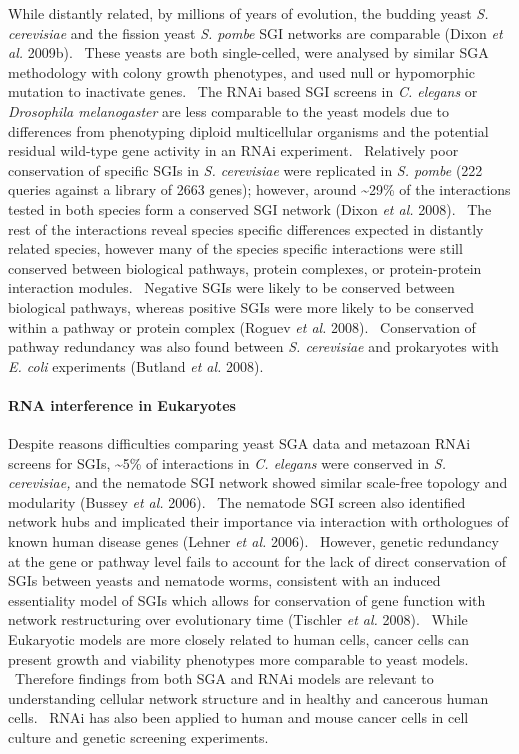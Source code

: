 While distantly related, by millions of years of evolution, the budding yeast \textit{S. cerevisiae} and the fission yeast \textit{S. pombe} SGI networks are comparable (Dixon\textit{ et al.} 2009b). \ These yeasts are both single-celled, were analysed by similar SGA methodology with colony growth phenotypes, and used null or hypomorphic mutation to inactivate genes. \ The RNAi based SGI screens in \textit{C. elegans }or \textit{Drosophila melanogaster} are less comparable to the yeast models due to differences from phenotyping diploid multicellular organisms and the potential residual wild-type gene activity in an RNAi experiment. \ Relatively poor conservation of specific SGIs in \textit{S. cerevisiae} were replicated in \textit{S. pombe} (222 queries against a library of 2663 genes); however, around \~{}29\% of the interactions tested in both species form a conserved SGI network (Dixon\textit{ et al.} 2008). \ The rest of the interactions reveal species specific differences expected in distantly related species, however many of the species specific interactions were still conserved between biological pathways, protein complexes, or protein-protein interaction modules. \ Negative SGIs were likely to be conserved between biological pathways, whereas positive SGIs were more likely to be conserved within a pathway or protein complex (Roguev\textit{ et al.} 2008). \ Conservation of pathway redundancy was also found between \textit{S. cerevisiae} and prokaryotes with \textit{E. coli} experiments (Butland\textit{ et al.} 2008). \

\paragraph{RNA interference in Eukaryotes}
Despite reasons difficulties comparing yeast SGA data and metazoan RNAi screens for SGIs, \~{}5\% of interactions in \textit{C. elegans} were conserved in \textit{S. cerevisiae,} and the nematode SGI network showed similar scale-free topology and modularity (Bussey\textit{ et al.} 2006). \ The nematode SGI screen also identified network hubs and implicated their importance via interaction with orthologues of known human disease genes (Lehner\textit{ et al.} 2006). \ However, genetic redundancy at the gene or pathway level fails to account for the lack of direct conservation of SGIs between yeasts and nematode worms, consistent with an induced essentiality model of SGIs which allows for conservation of gene function with network restructuring over evolutionary time (Tischler\textit{ et al.} 2008). \ While Eukaryotic models are more closely related to human cells, cancer cells can present growth and viability phenotypes more comparable to yeast models. \ Therefore findings from both SGA and RNAi models are relevant to understanding cellular network structure and in healthy and cancerous human cells. \ RNAi has also been applied to human and mouse cancer cells in cell culture and genetic screening experiments. \ 

